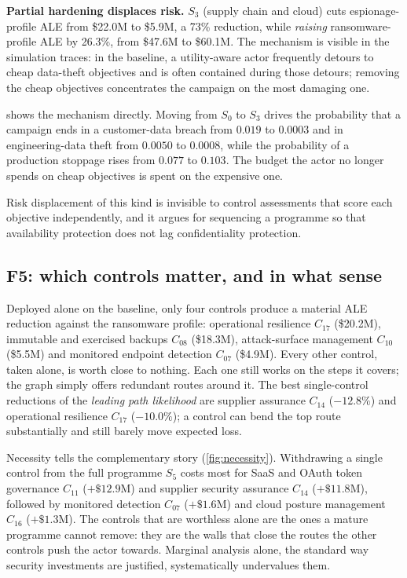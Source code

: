 \textbf{Partial hardening displaces risk.} $S_3$ (supply chain and cloud) cuts
espionage-profile ALE from \$22.0M to \$5.9M, a 73\% reduction, while \emph{raising} ransomware-profile ALE by 26.3\%, from \$47.6M to \$60.1M. The
mechanism is visible in the simulation traces: in the baseline, a utility-aware
actor frequently detours to cheap data-theft objectives and is often contained
during those detours; removing the cheap objectives concentrates the campaign
on the most damaging one.

 shows the mechanism directly. Moving from $S_0$ to $S_3$ drives
the probability that a campaign ends in a customer-data breach from $0.019$ to
$0.0003$ and in engineering-data theft from $0.0050$ to $0.0008$, while the
probability of a production stoppage rises from $0.077$ to $0.103$. The budget
the actor no longer spends on cheap objectives is spent on the expensive one.

Risk displacement of this kind is invisible to control assessments that score
each objective independently, and it argues for sequencing a programme so that
availability protection does not lag confidentiality protection.





\subsection{F5: which controls matter, and in what sense}

Deployed alone on the baseline, only four controls produce a material ALE
reduction against the ransomware profile: operational resilience $C_{17}$
(\$20.2M), immutable and exercised backups $C_{08}$ (\$18.3M), attack-surface
management $C_{10}$ (\$5.5M) and monitored endpoint detection $C_{07}$
(\$4.9M). Every other control, taken alone, is worth close to nothing. Each one still
works on the steps it covers; the graph simply offers redundant routes around
it. The best single-control reductions of the
\emph{leading path likelihood} are supplier assurance $C_{14}$ ($-12.8\%$) and
operational resilience $C_{17}$ ($-10.0\%$); a control can bend the top route
substantially and still barely move expected loss.

Necessity tells the complementary story (\cref{fig:necessity}). Withdrawing a
single control from the full programme $S_5$ costs most for SaaS and OAuth
token governance $C_{11}$ ($+\$12.9$M) and supplier security assurance
$C_{14}$ ($+\$11.8$M), followed by monitored detection $C_{07}$ ($+\$1.6$M)
and cloud posture management $C_{16}$ ($+\$1.3$M). The controls that are
worthless alone are the ones a mature programme cannot remove: they are the
walls that close the routes the other controls push the actor towards. Marginal
analysis alone, the standard way security investments are justified,
systematically undervalues them.

